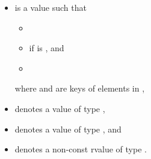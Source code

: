 \begin{itemize}
\item
{} is a value such that
  \begin{itemize}
  \item {}
  \item {} if  is , and
  \item {}
  \end{itemize}
  where  and  are keys of elements in ,
\item
{} denotes a value of type ,
\item
{} denotes a value of type , and
\item
{} denotes a non-const rvalue of type .
\end{itemize}

\newcommand{\indexunordmem}[1]{%
\indexlibrary{\idxcode{#1}!unordered associative containers}%
\indexlibrary{\idxcode{unordered_set}!\idxcode{#1}}%
\indexlibrary{\idxcode{unordered_map}!\idxcode{#1}}%
\indexlibrary{\idxcode{unordered_multiset}!\idxcode{#1}}%
\indexlibrary{\idxcode{unordered_multimap}!\idxcode{#1}}%
}


